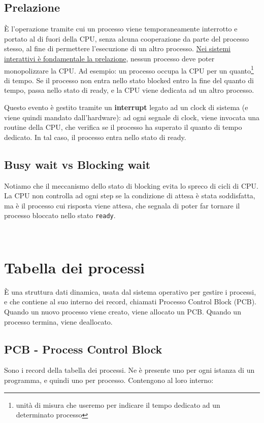 \documentclass{report}
\begin{document}
\subsection{Prelazione}
È l'operazione tramite cui un processo viene temporaneamente interrotto e portato al di fuori della CPU, senza alcuna cooperazione da parte del processo stesso, al fine di permettere l'esecuzione di un altro processo.
\underline{Nei sistemi interattivi è fondamentale la prelazione}, nessun processo deve poter monopolizzare la CPU. 
Ad esempio: un processo occupa la CPU per un quanto\footnote{unità di misura che useremo per indicare il tempo dedicato ad un determinato processo} di tempo. Se il processo non entra nello stato blocked entro la fine del quanto di tempo, passa nello stato di ready, e la CPU viene dedicata ad un altro processo.

Questo evento è gestito tramite un \textbf{interrupt} legato ad un clock di sistema (e viene quindi mandato dall'hardware): ad ogni segnale di clock, viene invocata una routine della CPU, che verifica se il processo ha superato il quanto di tempo dedicato. In tal caso, il processo entra nello stato di ready.


\subsection{Busy wait vs Blocking wait}
Notiamo che il meccanismo dello stato di blocking evita lo spreco di cicli di CPU. La CPU non controlla ad ogni step se la condizione di attesa è stata soddisfatta, ma è il processo cui risposta viene attesa, che segnala di poter far tornare il processo bloccato nello stato \verb|ready|.

\
\newpage


\section{Tabella dei processi}
È una struttura dati dinamica, usata dal sistema operativo per gestire i processi, e che contiene al suo interno dei record, chiamati Processo Control Block (PCB). Quando un nuovo processo viene creato, viene allocato un PCB. Quando un processo termina, viene deallocato.

\subsection{PCB - Process Control Block}
Sono i record della tabella dei processi. Ne è presente uno per ogni istanza di un programma, e quindi uno per processo. Contengono al loro interno:
\end{document}

